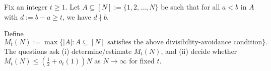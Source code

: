 Fix an integer $t\ge 1$.  Let $A\subseteq [N]:=\{1,2,\dots,N\}$ be such that for all $a<b$ in $A$ with $d:=b-a\ge t$, we have $d\nmid b$.

Define
\[
M_t(N):=\max\{|A|: A\subseteq [N]\text{ satisfies the above divisibility-avoidance condition}\}.
\]
The questions ask (i) determine/estimate $M_t(N)$, and (ii) decide whether $M_t(N)\le (\tfrac12+o_t(1))N$ as $N\to\infty$ for fixed $t$.
